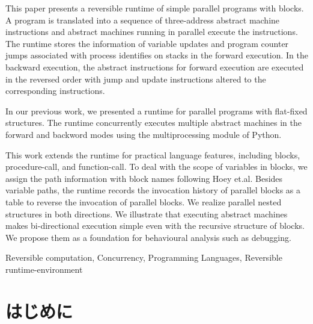 \documentclass[submit,PRO]{ipsj}
\begin{document}
\begin{eabstract}
This paper presents a reversible runtime of simple parallel programs
with blocks.  A program is translated into a sequence of three-address
abstract machine instructions and abstract machines running in
parallel execute the instructions.  The runtime stores the information
of variable updates and program counter jumps associated with process
identifies on stacks in the forward execution. 
In the backward
execution, the abstract instructions for forward execution are
executed in the reversed order with jump and update instructions altered to
the corresponding instructions.

In our previous work, we presented a runtime for parallel programs with
flat-fixed structures.  The runtime 
concurrently %
executes multiple abstract machines %
in the forward and backword modes %
using the multiprocessing module of Python.

This work extends the runtime for practical language features,
including blocks, procedure-call, and function-call. To deal with the
scope of variables in blocks, we assign the path information with
block names following Hoey et.al.  Besides variable paths, the runtime
records the invocation history of parallel blocks as a table to
reverse the invocation of parallel blocks.  We realize parallel nested
structures in both directions.  We illustrate that executing abstract
machines makes bi-directional execution simple even with the recursive
structure of blocks.  We propose them as a foundation for behavioural
analysis such as debugging.

\end{eabstract}

\begin{ekeyword}
Reversible computation, Concurrency, Programming Languages, Reversible runtime-environment
\end{ekeyword}

\maketitle

\section{はじめに}
\end{document}
